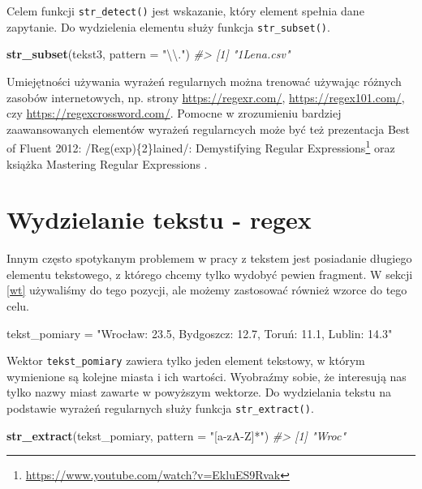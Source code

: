 \documentclass[paper=6in:9in,pagesize=pdftex,headinclude=on,footinclude=on,10pt]{scrbook}
\newenvironment{Shaded}{\begin{snugshade}}{\end{snugshade}}
\newcommand{\CharTok}[1]{\textcolor[rgb]{0.31,0.60,0.02}{#1}}
\newcommand{\CommentTok}[1]{\textcolor[rgb]{0.56,0.35,0.01}{\textit{#1}}}
\newcommand{\DataTypeTok}[1]{\textcolor[rgb]{0.13,0.29,0.53}{#1}}
\newcommand{\KeywordTok}[1]{\textcolor[rgb]{0.13,0.29,0.53}{\textbf{#1}}}
\newcommand{\NormalTok}[1]{#1}
\newcommand{\StringTok}[1]{\textcolor[rgb]{0.31,0.60,0.02}{#1}}
\DeclareRobustCommand{\href}[2]{#2\footnote{\url{#1}}}
\begin{document}
Celem funkcji \texttt{str\_detect()} jest wskazanie, który element spełnia dane zapytanie.
Do wydzielenia elementu służy funkcja \texttt{str\_subset()}.

\begin{Shaded}
\begin{Highlighting}[]
\KeywordTok{str_subset}\NormalTok{(tekst3, }\DataTypeTok{pattern =} \StringTok{"}\CharTok{\textbackslash{}\textbackslash{}}\StringTok{."}\NormalTok{)}
\CommentTok{#> [1] "1Lena.csv"}
\end{Highlighting}
\end{Shaded}

Umiejętności używania wyrażeń regularnych można trenować używając różnych zasobów internetowych, np. strony \url{https://regexr.com/}, \url{https://regex101.com/}, czy \url{https://regexcrossword.com/}.
Pomocne w zrozumieniu bardziej zaawansowanych elementów wyrażeń regularncych może być też prezentacja \href{https://www.youtube.com/watch?v=EkluES9Rvak}{Best of Fluent 2012: /Reg(exp)\{2\}lained/: Demystifying Regular Expressions} oraz książka Mastering Regular Expressions \citep{friedl2006mastering}.

\hypertarget{wtregex}{%
\section{Wydzielanie tekstu - regex}\label{wtregex}}

Innym często spotykanym problemem w pracy z tekstem jest posiadanie długiego elementu tekstowego, z którego chcemy tylko wydobyć pewien fragment.
W sekcji \ref{wt} używaliśmy do tego pozycji, ale możemy zastosować również wzorce do tego celu.

\begin{Shaded}
\begin{Highlighting}[]
\NormalTok{tekst_pomiary =}\StringTok{ "Wrocław: 23.5, Bydgoszcz: 12.7, Toruń: 11.1, Lublin: 14.3"}
\end{Highlighting}
\end{Shaded}

Wektor \texttt{tekst\_pomiary} zawiera tylko jeden element tekstowy, w którym wymienione są kolejne miasta i ich wartości.
Wyobraźmy sobie, że interesują nas tylko nazwy miast zawarte w powyższym wektorze.
Do wydzielania tekstu na podstawie wyrażeń regularnych służy funkcja \texttt{str\_extract()}.

\begin{Shaded}
\begin{Highlighting}[]
\KeywordTok{str_extract}\NormalTok{(tekst_pomiary, }\DataTypeTok{pattern =} \StringTok{"[a-zA-Z]*"}\NormalTok{)}
\CommentTok{#> [1] "Wroc"}
\end{Highlighting}
\end{Shaded}
\end{document}
